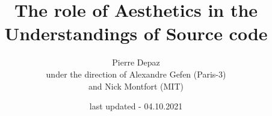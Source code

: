 \documentclass{article}
\begin{document}
\title{The role of Aesthetics in the Understandings of Source code}
\author{Pierre Depaz\\under the direction of Alexandre Gefen (Paris-3)\\and Nick Montfort (MIT)}
\date{last updated - 04.10.2021}
\maketitle



\pagebreak



\end{document}
